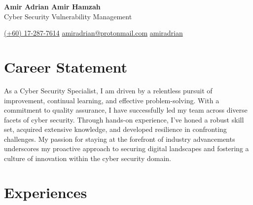 \documentclass[a4paper,10pt]{article}
\begin{document}
	
	\pagestyle{empty}
	
	\begin{center}
		\textbf{\Huge Amir Adrian Amir Hamzah} \\
		\vspace{2mm}
		 Cyber Security Vulnerability Management
	\end{center}
	
	\vspace{4mm}
	\begin{center}
		 \href{https://wa.me/60173877614}{(+60) 17-287-7614} \hspace{2cm}
		 \href{mailto:amiradriaan@protonmail.com}{amiradrian@protonmail.com} \hspace{2cm}
		 \href{https://www.linkedin.com/in/amiradrian/}{amiradrian}
	\end{center}
	
	
	\space
	\section*{ Career Statement}
	As a Cyber Security Specialist, I am driven by a relentless pursuit of improvement, continual learning, and effective problem-solving. With a commitment to quality assurance, I have successfully led my team across diverse facets of cyber security. Through hands-on experience, I've honed a robust skill set, acquired extensive knowledge, and developed resilience in confronting challenges. My passion for staying at the forefront of industry advancements underscores my proactive approach to securing digital landscapes and fostering a culture of innovation within the cyber security domain.
	
	\section*{ Experiences}
	
\end{document}
